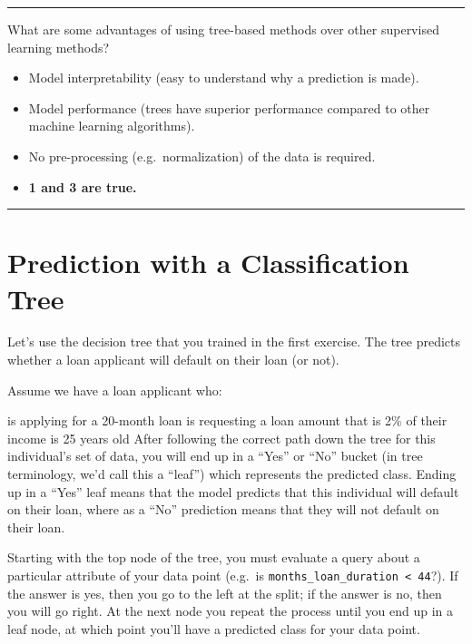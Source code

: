 \documentclass[
]{book}
\providecommand{\tightlist}{%
  \setlength{\itemsep}{0pt}\setlength{\parskip}{0pt}}
\begin{document}
\begin{center}\rule{0.5\linewidth}{0.5pt}\end{center}

What are some advantages of using tree-based methods over other supervised learning methods?

\begin{itemize}
\tightlist
\item
  Model interpretability (easy to understand why a prediction is made).
\item
  Model performance (trees have superior performance compared to other machine learning algorithms).
\item
  No pre-processing (e.g.~normalization) of the data is required.
\item
  \textbf{1 and 3 are true.}
\end{itemize}

\begin{center}\rule{0.5\linewidth}{0.5pt}\end{center}

\hypertarget{prediction-with-a-classification-tree}{%
\section{Prediction with a Classification Tree}\label{prediction-with-a-classification-tree}}

Let's use the decision tree that you trained in the first exercise. The tree predicts whether a loan applicant will default on their loan (or not).

Assume we have a loan applicant who:

is applying for a 20-month loan
is requesting a loan amount that is 2\% of their income
is 25 years old
After following the correct path down the tree for this individual's set of data, you will end up in a ``Yes'' or ``No'' bucket (in tree terminology, we'd call this a ``leaf'') which represents the predicted class. Ending up in a ``Yes'' leaf means that the model predicts that this individual will default on their loan, where as a ``No'' prediction means that they will not default on their loan.

Starting with the top node of the tree, you must evaluate a query about a particular attribute of your data point (e.g.~is \texttt{months\_loan\_duration\ \textless{}\ 44}?). If the answer is yes, then you go to the left at the split; if the answer is no, then you will go right. At the next node you repeat the process until you end up in a leaf node, at which point you'll have a predicted class for your data point.
\end{document}

